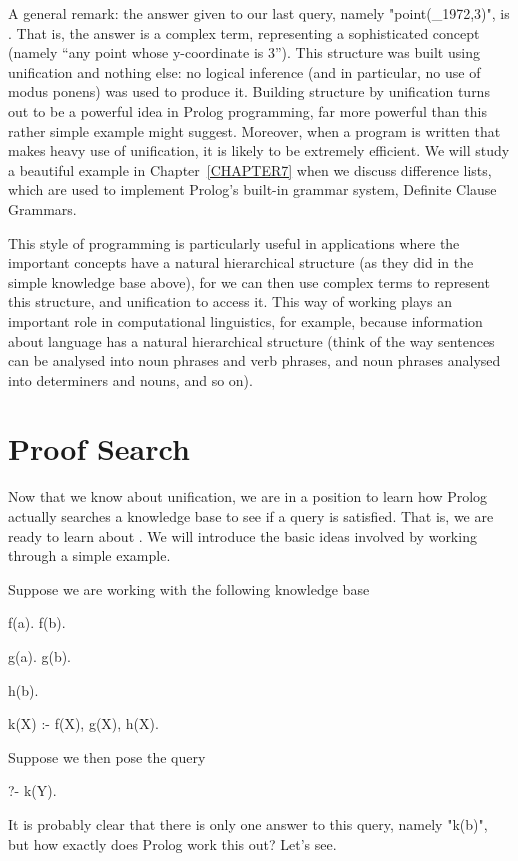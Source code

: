 A general remark: the answer given to our last query, namely
"point(_1972,3)", is . That is, the answer is a
complex term, representing a sophisticated concept (namely ``any point
whose y-coordinate is 3''). This structure was built using unification
and nothing else: no logical inference (and in particular, no use of
modus ponens) was used to produce it.  Building structure by
unification turns out to be a powerful idea in Prolog programming, far
more powerful than this rather simple example might suggest.
Moreover, when a program is written that makes heavy use of
unification, it is likely to be extremely efficient. We will study a
beautiful example in Chapter~\ref{CHAPTER7} when we discuss difference
lists, which are used to implement Prolog's built-in grammar system,
Definite Clause Grammars.

This style of programming is particularly useful in applications where
the important concepts have a natural hierarchical structure (as they
did in the simple knowledge base above), for we can then use complex
terms to represent this structure, and unification to access it.  This
way of working plays an important role in computational linguistics,
for example, because information about language has a natural
hierarchical structure (think of the way sentences can be analysed
into noun phrases and verb phrases, and noun phrases analysed into
determiners and nouns, and so on).



\section{Proof Search}\label{SEC.L2.PROOFSEARCH}

Now that we know about unification, we are in a position to learn how
Prolog actually searches a knowledge base to see if a query is
satisfied. That is, we are  ready to learn about .  We will introduce the basic ideas involved by working
through a simple example.

Suppose we are working with the following knowledge base
\begin{LPNcodedisplay}
f(a).
f(b).

g(a).
g(b).

h(b).

k(X) :- f(X), g(X), h(X).
\end{LPNcodedisplay}
%
Suppose we  then pose the query
\begin{LPNcodedisplay}
?- k(Y).
\end{LPNcodedisplay}
%
It is probably clear that there is only one answer to this query,
namely "k(b)", but how exactly does Prolog work this out? Let's see.

